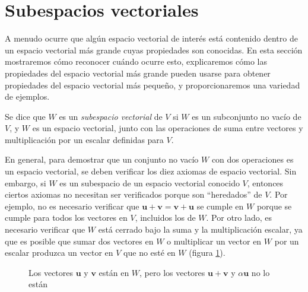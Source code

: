 \section{Subespacios vectoriales}

A menudo ocurre que algún espacio vectorial de interés está contenido dentro de un espacio vectorial más grande cuyas propiedades son conocidas. En esta sección mostraremos cómo reconocer cuándo ocurre esto, explicaremos cómo las propiedades del espacio vectorial más grande pueden usarse para obtener propiedades del espacio vectorial más pequeño, y proporcionaremos una variedad de ejemplos.

\newpage

\begin{definicion}{}{}
    Se dice que $W$ es un \emph{subespacio vectorial} de $V$ si $W$ es un subconjunto no vacío de $V$, y $W$ es un espacio vectorial, junto con las operaciones de suma entre vectores y multiplicación por un escalar definidas para $V$.
\end{definicion}

En general, para demostrar que un conjunto no vacío $W$ con dos operaciones es un espacio vectorial, se deben verificar los diez axiomas de espacio vectorial. Sin embargo, si $W$ es un subespacio de un espacio vectorial conocido $V$, entonces ciertos axiomas no necesitan ser verificados porque son “heredados” de $V$. Por ejemplo, no es necesario verificar que $\mathbf{u} + \mathbf{v} = \mathbf{v} + \mathbf{u}$ se cumple en $W$ porque se cumple para todos los vectores en $V$, incluidos los de $W$. Por otro lado, es necesario verificar que $W$ está cerrado bajo la suma y la multiplicación escalar, ya que es posible que sumar dos vectores en $W$ o multiplicar un vector en $W$ por un escalar produzca un vector en $V$ que no esté en $W$ (figura \ref{JAJJAJAJAJJQJQOOQPQZ}).
\begin{figure}[h!]
    \centering
    \caption{Los vectores $\mathbf{u}$ y $\mathbf{v}$ están en $W$, pero los vectores $\mathbf{u} + \mathbf{v}$ y $\alpha \mathbf{u}$ no lo están}
    \label{JAJJAJAJAJJQJQOOQPQZ}
\end{figure}

